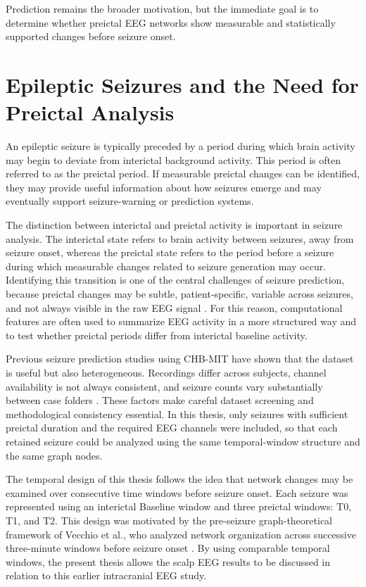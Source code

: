 Prediction remains the broader motivation, but the immediate
goal is to determine whether preictal EEG networks show measurable and
statistically supported changes before seizure onset.

\section{Epileptic Seizures and the Need for Preictal Analysis}
\label{sec:introduction-preictal-analysis}

An epileptic seizure is typically preceded by a period during which brain
activity may begin to deviate from interictal background activity. This period
is often referred to as the preictal period. If measurable preictal changes can
be identified, they may provide useful information about how seizures emerge and
may eventually support seizure-warning or prediction systems.

The distinction between interictal and preictal activity is important in
seizure analysis. The interictal state refers to brain activity between
seizures, away from seizure onset, whereas the preictal state refers to the
period before a seizure during which measurable changes related to seizure
generation may occur. Identifying this transition is one of the central
challenges of seizure prediction, because preictal changes may be subtle,
patient-specific, variable across seizures, and not always visible in the raw
EEG signal \cite{Mormann2007,Kuhlmann2018}. For this reason, computational
features are often used to summarize EEG activity in a more structured way and
to test whether preictal periods differ from interictal baseline activity.

Previous seizure prediction studies using CHB-MIT have shown that the dataset
is useful but also heterogeneous. Recordings differ across subjects, channel
availability is not always consistent, and seizure counts vary substantially
between case folders \cite{Tsiouris2018}. These factors make careful dataset
screening and methodological consistency essential. In this thesis, only
seizures with sufficient preictal duration and the required EEG channels were
included, so that each retained seizure could be analyzed using the same
temporal-window structure and the same graph nodes.

The temporal design of this thesis follows the idea that network changes may be
examined over consecutive time windows before seizure onset. Each seizure was
represented using an interictal Baseline window and three preictal windows:
T0, T1, and T2. This design was motivated by the pre-seizure graph-theoretical
framework of Vecchio et al., who analyzed network organization across
successive three-minute windows before seizure onset \cite{Vecchio2016}. By
using comparable temporal windows, the present thesis allows the scalp EEG
results to be discussed in relation to this earlier intracranial EEG study.

